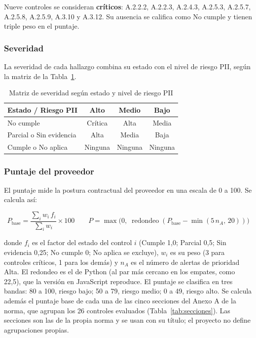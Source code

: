 \documentclass[12pt,letterpaper]{article}
\begin{document}
Nueve controles se consideran \textbf{críticos}: A.2.2.2, A.2.2.3, A.2.4.3, A.2.5.3, A.2.5.7, A.2.5.8, A.2.5.9, A.3.10 y A.3.12. Su ausencia se califica como No cumple y tienen triple peso en el puntaje.

\subsubsection{Severidad}

La severidad de cada hallazgo combina su estado con el nivel de riesgo PII, según la matriz de la Tabla~\ref{tab:severidad}.

\begin{table}[H]
\centering
\small
\caption{Matriz de severidad según estado y nivel de riesgo PII}
\label{tab:severidad}
\begin{tabular}{@{}l c c c@{}}
\toprule
\textbf{Estado / Riesgo PII} & \textbf{Alto} & \textbf{Medio} & \textbf{Bajo} \\
\midrule
No cumple & Crítica & Alta & Media \\
Parcial o Sin evidencia & Alta & Media & Baja \\
Cumple o No aplica & Ninguna & Ninguna & Ninguna \\
\bottomrule
\end{tabular}
\end{table}

\subsubsection{Puntaje del proveedor}

El puntaje mide la postura contractual del proveedor en una escala de 0 a 100. Se calcula así:

\begin{equation}
P_{\text{base}} = \frac{\sum_{i} w_i \, f_i}{\sum_{i} w_i} \times 100
\qquad
P = \max\bigl(0,\; \operatorname{redondeo}(P_{\text{base}} - \min(5\,n_A,\, 20))\bigr)
\end{equation}

\noindent donde $f_i$ es el factor del estado del control $i$ (Cumple 1,0; Parcial 0,5; Sin evidencia 0,25; No cumple 0; No aplica se excluye), $w_i$ es su peso (3 para controles críticos, 1 para los demás) y $n_A$ es el número de alertas de prioridad Alta. El redondeo es el de Python (al par más cercano en los empates, como 22,5), que la versión en JavaScript reproduce. El puntaje se clasifica en tres bandas: 80 a 100, riesgo bajo; 50 a 79, riesgo medio; 0 a 49, riesgo alto. Se calcula además el puntaje base de cada una de las cinco secciones del Anexo A de la norma, que agrupan los 26 controles evaluados (Tabla~\ref{tab:secciones}). Las secciones son las de la propia norma y se usan con su título; el proyecto no define agrupaciones propias.
\end{document}

